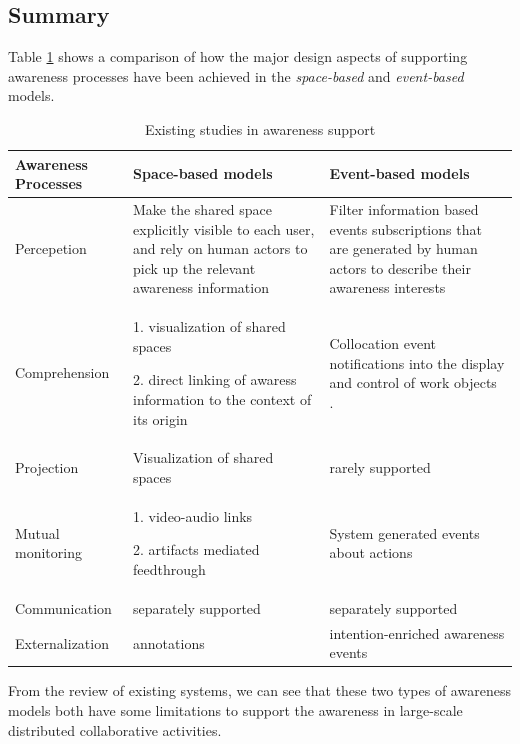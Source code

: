 \subsection{Summary} %
\label{sub:summary}
Table \ref{tab:existing_studies} shows a comparison of how the major design aspects of supporting awareness processes have been achieved in the \emph{space-based} and \emph{event-based} models.

\begin{table}[htbp]
\centering
\footnotesize
\begin{tabular}{>{\raggedright}p{1.1in}>{\raggedright}p{2.2in}>{\raggedright}p{2.2in}}

\toprule 
\textbf{Awareness Processes} & \textbf{Space-based models} & \textbf{Event-based models}\tabularnewline
\midrule 
Percepetion & Make the shared space explicitly visible to each user, and rely on
human actors to pick up the relevant awareness information  & Filter information based events subscriptions that are generated by
human actors to describe their awareness interests\tabularnewline
\midrule 
Comprehension & 1. visualization of shared spaces

2. direct linking of awaress information to the context of its origin & Collocation event notifications into the display and control of work
objects \cite{prinz1999a,carroll2003a}.\tabularnewline
\midrule 
Projection & Visualization of shared spaces & rarely supported\tabularnewline
\midrule 
Mutual monitoring & 1. video-audio links \cite{Dourish1992}

2. artifacts mediated feedthrough \cite{Tee2009} & System generated events about actions \cite{Fuchs1995}\tabularnewline
\midrule 
Communication & separately supported & separately supported\tabularnewline
\midrule 
Externalization & annotations \cite{Zheng2006,Weng2004} & intention-enriched awareness events \cite{Rittenbruch2007}\tabularnewline
\bottomrule

\end{tabular}  
\caption{Existing studies in awareness support}
\label{tab:existing_studies}
\end{table}

From the review of existing systems, we can see that these two types of awareness models both have some limitations to support the awareness in large-scale distributed collaborative activities. 

